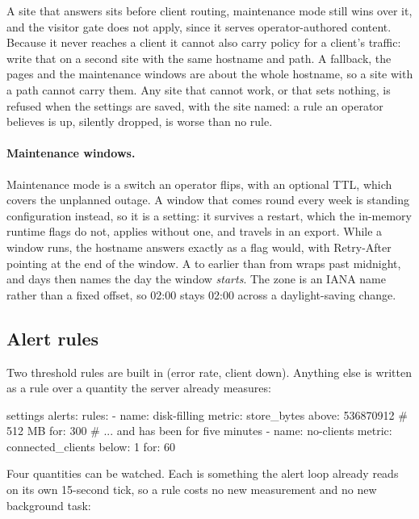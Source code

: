 \documentclass[11pt,a4paper,oneside]{book}
\newcommand{\aperiobreakableunderscore}{\textunderscore\allowbreak}
\newcommand{\aperiocodebreaks}{\XeTeXinterchartokenstate=1 }
\newcommand{\aperiocodebreaks}{}
\DeclareRobustCommand{\code}[1]{{\ttfamily\small\aperiocodebreaks
  \let\_\aperiobreakableunderscore#1}}
\begin{document}
A site that answers sits before client routing, maintenance mode still wins
over it, and the visitor gate does not apply, since it serves
operator-authored content. Because it never reaches a client it cannot also
carry policy for a client's traffic: write that on a second site with the
same hostname and path. A fallback, the pages and the maintenance windows are
about the whole hostname, so a site with a \code{path} cannot carry them. Any
site that cannot work, or that sets nothing, is refused when the settings
are saved, with the site named: a rule an operator believes is up, silently
dropped, is worse than no rule.

\paragraph{Maintenance windows.} Maintenance mode is a switch an operator
flips, with an optional TTL, which covers the unplanned outage. A window
that comes round every week is standing configuration instead, so it is a
setting: it survives a restart, which the in-memory runtime flags do not,
applies without one, and travels in an export. While a window runs, the
hostname answers exactly as a flag would, with \code{Retry-After} pointing at
the end of the window. A \code{to} earlier than \code{from} wraps past
midnight, and \code{days} then names the day the window \emph{starts}. The
zone is an IANA name rather than a fixed offset, so 02:00 stays 02:00 across
a daylight-saving change.

\subsection{Alert rules}
\label{sec:alert-rules}

Two threshold rules are built in (error rate, client down). Anything else is
written as a rule over a quantity the server already measures:

\begin{codecard}[aperioyaml]{settings}
alerts:
  rules:
    - name: disk-filling
      metric: store_bytes
      above: 536870912        # 512 MB
      for: 300                # ... and has been for five minutes
    - name: no-clients
      metric: connected_clients
      below: 1
      for: 60
\end{codecard}

Four quantities can be watched. Each is something the alert loop already
reads on its own 15-second tick, so a rule costs no new measurement and no
new background task:
\end{document}
